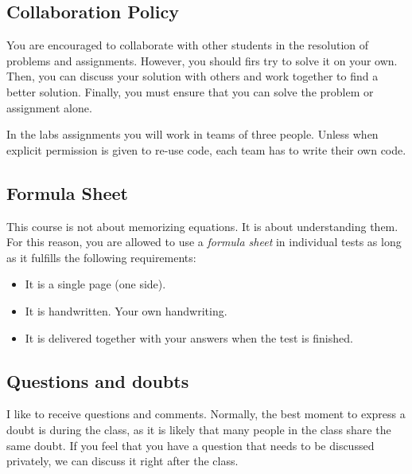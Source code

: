 \subsection{Collaboration Policy}
You are encouraged to collaborate with other students in the resolution of problems and assignments.
However, you should firs try to solve it on your own.
Then, you can discuss your solution with others and work together to find a better solution.
Finally, you must ensure that you can solve the problem or assignment alone.

In the labs assignments you will work in teams of three people.
Unless when explicit permission is given to re-use code, each team has to write their own code.

\subsection{Formula Sheet}
This course is not about memorizing equations.
It is about understanding them.
For this reason, you are allowed to use a \emph{formula sheet} in individual tests as long as it fulfills the following requirements:
\begin{itemize}
\item It is a single page (one side).
\item It is handwritten. Your own handwriting.
\item It is delivered together with your answers when the test is finished.
\end{itemize}

\subsection{Questions and doubts}
I like to receive questions and comments.
Normally, the best moment to express a doubt is during the class, as it is likely that many people in the class share the same doubt.
If you feel that you have a question that needs to be discussed privately, we can discuss it right after the class.

